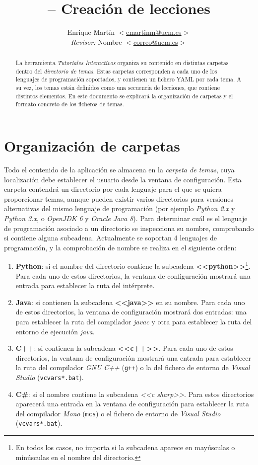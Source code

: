 \documentclass[]{article}
\title{\toolname{} -- Creación de lecciones}
\author{Enrique Martín $<$\url{emartinm@ucm.es}$>$ \\ \emph{Revisor:} Nombre $<$\url{correo@ucm.es}$>$\\}
\newcommand{\code}[1]{{\lstinline[basicstyle=\ttfamily,mathescape]!#1!}}
\newcommand{\toolname}{\emph{Tutoriales Interactivos}}
\begin{document}
\maketitle

\begin{abstract}
La herramienta \toolname{} organiza su contenido en distintas carpetas dentro del \emph{directorio de temas}. Estas carpetas corresponden a cada uno de los lenguajes de programación soportados, y contienen un fichero YAML por cada tema. A su vez, los temas están definidos como una secuencia de lecciones, que contiene distintos elementos. En este documento se explicará la organización de carpetas y el formato concreto de los ficheros de temas.
\end{abstract}


\section{Organización de carpetas}
Todo el contenido de la aplicación se almacena en la \emph{carpeta de temas}, cuya localización debe establecer el usuario desde la ventana de configuración. Esta carpeta contendrá un directorio por cada lenguaje para el que se quiera proporcionar temas, aunque pueden existir varios directorios para versiones alternativas del mismo lenguaje de programación (por ejemplo \emph{Python 2.x} y \emph{Python 3.x}, o \emph{OpenJDK 6} y \emph{Oracle Java 8}). Para determinar cuál es el lenguaje de programación asociado a un directorio se inspecciona su nombre, comprobando si contiene alguna subcadena. Actualmente se soportan 4 lenguajes de programación, y la comprobación de nombre se realiza en el siguiente orden:

\begin{enumerate}
  \item \textbf{Python}: si el nombre del directorio contiene la subcadena \textbf{<<python>>}\footnote{En todos los casos, no importa si la subcadena aparece en mayúsculas o minúsculas en el nombre del directorio.}. Para cada uno de estos directorios, la ventana de configuración mostrará una entrada para establecer la ruta del intérprete.
  \item \textbf{Java}: si contienen la subcadena \textbf{<<java>>} en su nombre. Para cada uno de estos directorios, la ventana de configuración mostrará dos entradas: una para establecer la ruta del compilador \emph{javac} y otra para establecer la ruta del entorno de ejecución \emph{java}.
  \item \textbf{C++}: si contienen la subcadena \textbf{<<c++>>}. Para cada uno de estos directorios, la ventana de configuración mostrará una entrada para establecer la ruta del compilador \emph{GNU C++} (\code{g++}) o la del fichero de entorno de \emph{Visual Studio} (\code{vcvars*.bat}). 
  \item \textbf{C\#}: si el nombre contiene la subcadena \emph{<<c sharp>>}. Para estos directorios aparecerá una entrada en la ventana de configuración para establecer la ruta del compilador \emph{Mono} (\code{mcs}) o el fichero de entorno de \emph{Visual Studio} (\code{vcvars*.bat}).
\end{enumerate}
\end{document}
